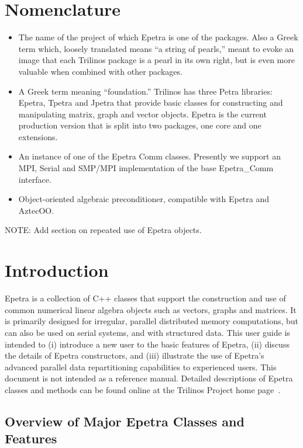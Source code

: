\documentclass[12pt,relax]{EpetraUserGuide}
\newcommand{\comm}{Epetra\_Comm}
\begin{document}
\section*{Nomenclature}
\begin{itemize}
\item[Trilinos]
The name of the project of which Epetra is one of the packages.  Also a Greek term which,
loosely translated means ``a string of pearls,''
meant to evoke an image that each Trilinos package is a pearl in its
own right, but is even more valuable when combined with other
packages.
\item[Petra]
A Greek term meaning ``foundation.''  Trilinos has three Petra
libraries: Epetra, Tpetra and Jpetra that provide basic classes
for constructing and manipulating matrix, graph and vector
objects.  Epetra is the current production version that is
split into two packages, one core and one extensions.
\item[Comm Object]
An instance of one of the Epetra Comm classes.  Presently we support
an MPI, Serial and SMP/MPI implementation of the base \comm{} interface.
\item[Map Object]
Object-oriented algebraic preconditioner, compatible with
Epetra and AztecOO.
\end{itemize}

NOTE: Add section on repeated use of Epetra objects.


\section{Introduction}
\label{Section:Introduction}

Epetra is a collection of C++ classes that support the construction
and use of common numerical linear algebra objects such as vectors,
graphs and matrices.  It is primarily designed for irregular, parallel
distributed memory computations, but can also be used on serial
systems, and
with structured data.  This user guide is intended to (i) introduce a new
user to the basic features of Epetra, (ii) discuss the details of Epetra
constructors, and (iii) illustrate the use of
Epetra's advanced parallel data repartitioning capabilities to
experienced users.  This document is not intended as a reference
manual.  Detailed descriptions of Epetra classes and methods can be
found online at the Trilinos Project home page~\cite{Trilinos-home-page}.


\subsection{Overview of Major Epetra Classes and Features}
\label{Section:Introduction:Overview}
\end{document}
